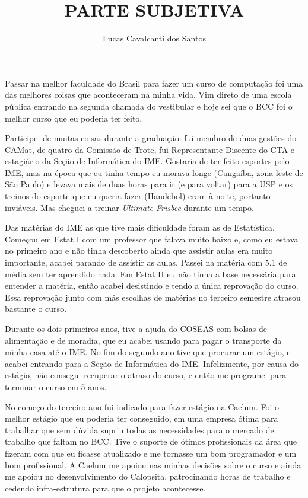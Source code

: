 \documentclass[titlepage,a4paper]{article}
\title{PARTE SUBJETIVA}
\author{Lucas Cavalcanti dos Santos}
\newcommand{\calopsita}{Calopsita}
\begin{document}
\maketitle

Passar na melhor faculdade do Brasil para fazer um curso de computação foi uma das melhores coisas que aconteceram na minha vida. Vim direto de uma escola pública entrando na segunda chamada do vestibular e hoje sei que o BCC foi o melhor curso que eu poderia ter feito.

Participei de muitas coisas durante a graduação: fui membro de duas gestões do CAMat, de quatro da Comissão de Trote, fui Representante Discente do CTA e estagiário da Seção de Informática do IME. Gostaria de ter feito esportes pelo IME, mas na época que eu tinha tempo eu morava longe (Cangaíba, zona leste de São Paulo) e levava mais de duas horas para ir (e para voltar) para a USP e os treinos do esporte que eu queria fazer (Handebol) eram à noite, portanto inviáveis. Mas cheguei a treinar \textit{Ultimate Frisbee} durante um tempo.

Das matérias do IME as que tive mais dificuldade foram as de Estatística. Começou em Estat I com um professor que falava muito baixo e, como eu estava no primeiro ano e não tinha descoberto ainda que assistir aulas era muito importante, acabei parando de assistir as aulas. Passei na matéria com 5.1 de média sem ter aprendido nada. Em Estat II eu não tinha a base necessária para entender a matéria, então acabei desistindo e tendo a única reprovação do curso. Essa reprovação junto com más escolhas de matérias no terceiro semestre atrasou bastante o curso.

Durante os dois primeiros anos, tive a ajuda do COSEAS com bolsas de alimentação e de moradia, que eu acabei usando para pagar o transporte da minha casa até o IME. No fim do segundo ano tive que procurar um estágio, e acabei entrando para a Seção de Informática do IME. Infelizmente, por causa do estágio, não consegui recuperar o atraso do curso, e então me programei para terminar o curso em 5 anos.

No começo do terceiro ano fui indicado para fazer estágio na Caelum. Foi o melhor estágio que eu poderia ter conseguido, em uma empresa ótima para trabalhar que sem dúvida supriu todas as necessidades para o mercado de trabalho que faltam no BCC. Tive o suporte de ótimos profissionais da área que fizeram com que eu ficasse atualizado e me tornasse um bom programador e um bom profissional. A Caelum me apoiou nas minhas decisões sobre o curso e ainda me apoiou no desenvolvimento do \calopsita{}, patrocinando horas de trabalho e cedendo infra-estrutura para que o projeto acontecesse.
\end{document}
